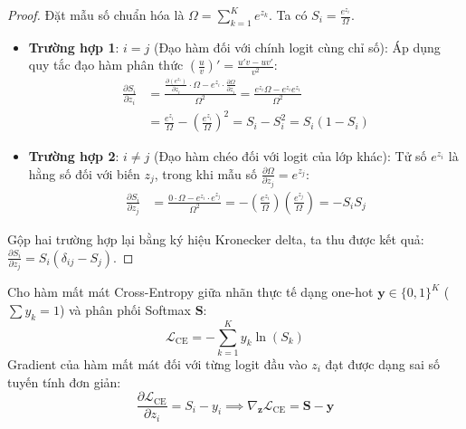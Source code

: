 \begin{proof}
Đặt mẫu số chuẩn hóa là $\Omega = \sum_{k=1}^K e^{z_k}$. Ta có $S_i = \frac{e^{z_i}}{\Omega}$.
\begin{itemize}
  \item \textbf{Trường hợp 1}: $i = j$ (Đạo hàm đối với chính logit cùng chỉ số):
  Áp dụng quy tắc đạo hàm phân thức $\left(\frac{u}{v}\right)' = \frac{u'v - uv'}{v^2}$:
  \begin{align*}
  \frac{\partial S_i}{\partial z_i} &= \frac{\frac{\partial (e^{z_i})}{\partial z_i} \cdot \Omega - e^{z_i} \cdot \frac{\partial \Omega}{\partial z_i}}{\Omega^2} = \frac{e^{z_i} \Omega - e^{z_i} e^{z_i}}{\Omega^2} \\
  &= \frac{e^{z_i}}{\Omega} - \left(\frac{e^{z_i}}{\Omega}\right)^2 = S_i - S_i^2 = S_i(1 - S_i)
  \end{align*}
  \item \textbf{Trường hợp 2}: $i \neq j$ (Đạo hàm chéo đối với logit của lớp khác):
  Tử số $e^{z_i}$ là hằng số đối với biến $z_j$, trong khi mẫu số $\frac{\partial \Omega}{\partial z_j} = e^{z_j}$:
  \begin{align*}
  \frac{\partial S_i}{\partial z_j} &= \frac{0 \cdot \Omega - e^{z_i} \cdot e^{z_j}}{\Omega^2} = - \left(\frac{e^{z_i}}{\Omega}\right) \left(\frac{e^{z_j}}{\Omega}\right) = - S_i S_j
  \end{align*}
\end{itemize}
Gộp hai trường hợp lại bằng ký hiệu Kronecker delta, ta thu được kết quả: $\frac{\partial S_i}{\partial z_j} = S_i(\delta_{ij} - S_j)$.
\end{proof}

\begin{theorem}
Cho hàm mất mát Cross-Entropy giữa nhãn thực tế dạng one-hot $\mathbf{y} \in \{0, 1\}^K$ ($\sum y_k = 1$) và phân phối Softmax $\mathbf{S}$:
\begin{equation}
\mathcal{L}_{\text{CE}} = - \sum_{k=1}^K y_k \ln(S_k)
\end{equation}
Gradient của hàm mất mát đối với từng logit đầu vào $z_i$ đạt được dạng sai số tuyến tính đơn giản:
\begin{equation}
\frac{\partial \mathcal{L}_{\text{CE}}}{\partial z_i} = S_i - y_i \implies \nabla_{\mathbf{z}} \mathcal{L}_{\text{CE}} = \mathbf{S} - \mathbf{y}
\end{equation}
\end{theorem}


